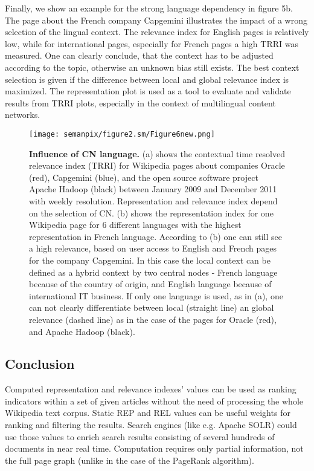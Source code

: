 \documentclass[a4paper,10pt]{scrbook}
\begin{document}
Finally, we show an example for the strong language dependency in figure 5b. The page about the French company Capgemini illustrates the impact of a wrong selection of the lingual context. The relevance index for English pages is relatively low, while for international pages, especially for French pages a high TRRI was measured. One can clearly conclude, that the context has to be adjusted according to the topic, otherwise an unknown bias still exists. The best context selection is given if the difference between local and global relevance index is maximized. The representation plot is used as a tool to evaluate and validate results from TRRI plots, especially in the context of multilingual content networks. 

\begin{figure*}[t!]
  \centering
      \texttt{[image: semanpix/figure2.sm/Figure6new.png]}
      \label{fig.sm2b}
      \label{fig.sm2a}
\caption{\textbf{Influence of CN language.} (a) shows the contextual time resolved relevance index (TRRI) for Wikipedia pages about companies Oracle (red), Capgemini (blue), and the open source software project Apache Hadoop (black) between January 2009 and December 2011 with weekly resolution. Representation and relevance index depend on the selection of CN. (b) shows the representation index for one Wikipedia page for 6 different languages with the highest representation in French language. According to (b) one can still see a high relevance, based on user access to English and French pages for the company Capgemini. In this case the local context can be defined as a hybrid context by two central nodes - French language because of the country of origin, and English language because of international IT business. If only one language is used, as in (a), one can not clearly differentiate between local (straight line) an global relevance (dashed line) as in the case of the pages for Oracle (red), and Apache Hadoop (black).   
}
\end{figure*}


\subsection{Conclusion}
Computed representation and relevance indexes' values can be used as ranking indicators within a set of given 
articles without the need of processing the whole Wikipedia text corpus. Static REP and REL values can be useful weights 
for ranking and filtering the results. Search engines (like e.g. Apache SOLR) could use those values to
enrich search results consisting of several hundreds of documents in near real time. Computation requires only partial information, not the full page graph (unlike in the case of the PageRank algorithm). 
\end{document}
